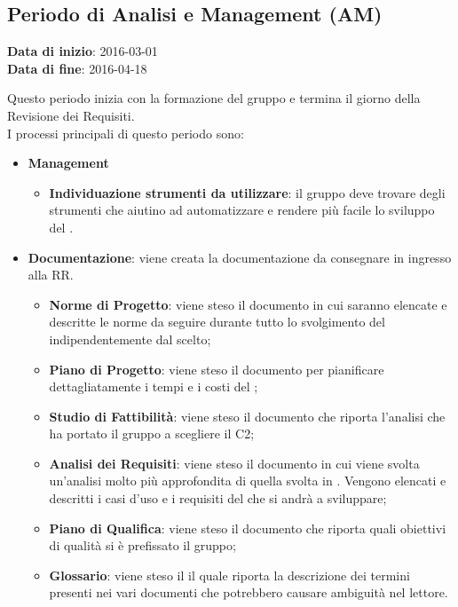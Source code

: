 	\subsection{Periodo di Analisi e Management (AM)}
	\begin{center}
		\textbf{Data di inizio}: 2016-03-01 \\
		\textbf{Data di fine}: 2016-04-18 \\
	\end{center}

	Questo periodo inizia con la formazione del gruppo e termina il giorno della Revisione dei Requisiti. \\
	I processi principali di questo periodo sono: 
	\begin{itemize}
		\item \textbf{Management}
			\att
			\begin{itemize} 
				\item \textbf{Individuazione strumenti da utilizzare}: il gruppo deve trovare degli strumenti che aiutino ad automatizzare e rendere più facile lo sviluppo del .
			\end{itemize}
		\item \textbf{Documentazione}: viene creata la documentazione da consegnare in ingresso alla RR.
		\att
		\begin{itemize}
			\item \textbf{Norme di Progetto}: viene steso il documento \NPdocRR{} in cui saranno elencate e descritte le norme da seguire durante tutto lo svolgimento del  indipendentemente dal  scelto; 
			\item \textbf{Piano di Progetto}: viene steso il documento \PPdocRR{} per pianificare dettagliatamente i tempi e i costi del ;
			\item \textbf{Studio di Fattibilità}: viene steso il documento \SFdocRR{} che riporta l'analisi che ha portato il gruppo a scegliere il  C2;
			\item \textbf{Analisi dei Requisiti}: viene steso il documento \ARdocRR{} in cui viene svolta un'analisi molto più approfondita di quella svolta in \SFdocRR. Vengono elencati e descritti i casi d'uso e i requisiti del  che si andrà a sviluppare;
			\item \textbf{Piano di Qualifica}: viene steso il documento \PQdocRR{} che riporta quali obiettivi di qualità si è prefissato il gruppo;
			\item \textbf{Glossario}: viene steso il \GldocRR{} il quale riporta la descrizione dei termini presenti nei vari documenti che potrebbero causare ambiguità nel lettore.

\end{itemize}
\end{itemize}
